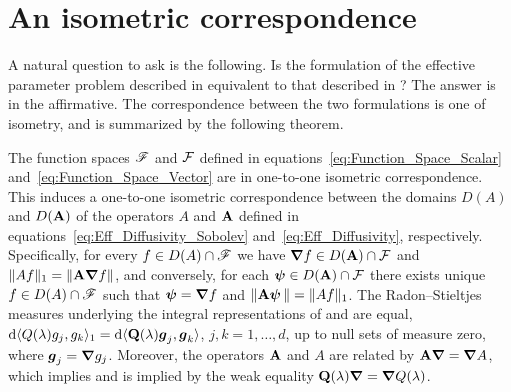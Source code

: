 \documentclass[amsa]{ipart}
\begin{document}
\section{An isometric
  correspondence} \label{sec:Isometric_Correspondence} 
%
A natural question to ask is the following. Is the formulation of the
effective parameter problem described in 
equivalent to that described in ? The answer
is in the affirmative. The correspondence between the two formulations
is one of isometry, and is summarized by the following theorem.  
%
\begin{theorem}\label{thm:Formulation_Equivalence}
%  
The function spaces $\mathscr{F}$ and $\mathcal{F}$ defined in
equations~\eqref{eq:Function_Space_Scalar}
and~\eqref{eq:Function_Space_Vector} are in one-to-one isometric
correspondence. This induces a one-to-one 
isometric correspondence between the domains $D(A)$ and $D(\mathbf{A})$ of
the operators $A$ and $\mathbf{A}$ defined in
equations~\eqref{eq:Eff_Diffusivity_Sobolev}
and~\eqref{eq:Eff_Diffusivity}, 
respectively. Specifically, for every $f\in D(A)\cap\mathscr{F}$ we have
$\mbox{\boldmath${\nabla}$} f\in D(\mathbf{A})\cap\mathcal{F}$ and $\|Af\|_1=\|\mathbf{A}\mbox{\boldmath${\nabla}$} f\|$, and conversely,
for each $\boldsymbol{\psi}\in D(\mathbf{A})\cap\mathcal{F}$ there exists unique $f\in D(A)\cap\mathscr{F}$ such that
$\boldsymbol{\psi}=\mbox{\boldmath${\nabla}$} f$  and $\|\mathbf{A}\boldsymbol{\psi}\,\|=\|Af\|_1$. The Radon--Stieltjes
measures underlying the integral representations of 
and  are equal, $\mathrm{d}\langle
Q(\lambda)g_j,g_k\rangle_1=\mathrm{d}\langle\mathbf{Q}(\lambda)\boldsymbol{g}_j,\boldsymbol{g}_k\rangle$, $j,k=1,\ldots,d$, up to null
sets of measure zero, where $\boldsymbol{g}_j=\mbox{\boldmath${\nabla}$} g_j$. Moreover, the
operators $\mathbf{A}$ and $A$ are related by $\mathbf{A}\mbox{\boldmath${\nabla}$} =\mbox{\boldmath${\nabla}$} A$, which
implies and is implied by the weak equality $\mathbf{Q}(\lambda)\mbox{\boldmath${\nabla}$} =\mbox{\boldmath${\nabla}$}
Q(\lambda)$. 
%
\end{theorem}
%
\end{document}
